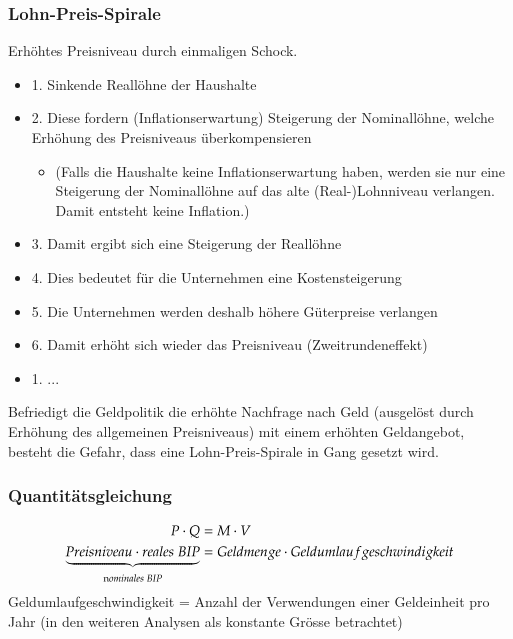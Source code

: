 \vspace{-\baselineskip}
\subsubsection{Lohn-Preis-Spirale}
Erhöhtes Preisniveau durch einmaligen Schock.
\begin{itemize}
	\item[\-] 1. Sinkende Reallöhne der Haushalte
	\item[\-] 2. Diese fordern (Inflationserwartung) Steigerung der Nominallöhne, welche Erhöhung des Preisniveaus überkompensieren
	\begin{itemize}
		\item[\-] (Falls die Haushalte keine Inflationserwartung haben, werden sie nur eine Steigerung der Nominallöhne auf das alte (Real-)Lohnniveau verlangen. Damit entsteht keine Inflation.)
	\end{itemize}
	\item[\-] 3. Damit ergibt sich eine Steigerung der Reallöhne
	\item[\-] 4. Dies bedeutet für die Unternehmen eine Kostensteigerung
	\item[\-] 5. Die Unternehmen werden deshalb höhere Güterpreise verlangen
	\item[\-] 6. Damit erhöht sich wieder das Preisniveau (Zweitrundeneffekt)
	\item[\-] 1. ...
\end{itemize}
Befriedigt die Geldpolitik die erhöhte Nachfrage nach Geld 
(ausgelöst durch Erhöhung des allgemeinen Preisniveaus) mit einem erhöhten Geldangebot, besteht die Gefahr, dass eine Lohn-Preis-Spirale in Gang gesetzt wird.

\subsubsection{Quantitätsgleichung}
\begin{align*} 
    P \cdot Q &= M \cdot V\\
	\underbrace{Preisniveau \cdot reales \; BIP}_{\text nominales \; BIP} &= Geldmenge \cdot Geldumlaufgeschwindigkeit
\end{align*}
Geldumlaufgeschwindigkeit = Anzahl der Verwendungen einer Geldeinheit pro Jahr (in den weiteren Analysen als konstante Grösse betrachtet)

